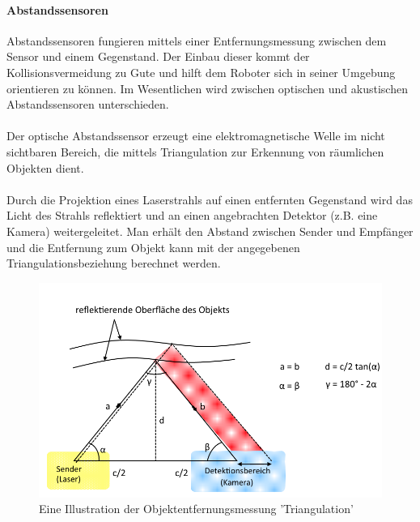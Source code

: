 \documentclass[11pt, a4paper]{article}
\begin{document}
\paragraph{Abstandssensoren}
Abstandssensoren fungieren mittels einer Entfernungsmessung zwischen dem Sensor und einem
Gegenstand. Der Einbau dieser kommt der Kollisionsvermeidung zu Gute und hilft dem Roboter sich
in seiner Umgebung orientieren zu k\"onnen. Im Wesentlichen wird zwischen optischen und
akustischen Abstandssensoren unterschieden. \\ \\
Der optische Abstandssensor erzeugt eine elektromagnetische Welle im nicht sichtbaren Bereich, die
mittels Triangulation zur Erkennung von r\"aumlichen Objekten dient. \\ \\
Durch die Projektion eines Laserstrahls auf einen entfernten Gegenstand wird das Licht des Strahls
reflektiert und an einen angebrachten Detektor (z.B. eine Kamera) weitergeleitet. Man erh\"alt den
Abstand zwischen Sender und Empf\"anger und die Entfernung zum Objekt kann mit der angegebenen
Triangulationsbeziehung berechnet werden. \\
\begin{figure}[h!]
		\centering
		\includegraphics[width=1.0\textwidth]{graphics/sensors/triangulation-selfmade}
		\caption{Eine Illustration der Objektentfernungsmessung 'Triangulation'{\cite{robot-sensors}}}
\end{figure} 
\end{document}
